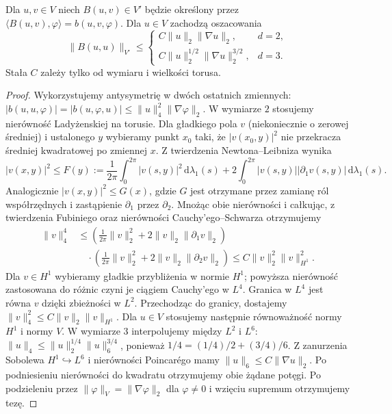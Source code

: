 \begin{lemat}
\label{lem:pde28-B-est}
Dla $u,v\in V$ niech $B(u,v)\in V'$ będzie określony przez
$\langle B(u,v),\varphi\rangle=b(u,v,\varphi)$.
Dla $u\in V$ zachodzą oszacowania
\[
 \|B(u,u)\|_{V'}\le
 \begin{cases}
 C\|u\|_2\|\nabla u\|_2,&d=2,\\
 C\|u\|_2^{1/2}\|\nabla u\|_2^{3/2},&d=3.
 \end{cases}
\]
Stała $C$ zależy tylko od wymiaru i wielkości torusa.
\end{lemat}
\begin{proof}
Wykorzystujemy antysymetrię w dwóch ostatnich zmiennych:
$|b(u,u,\varphi)|=|b(u,\varphi,u)|
\le\|u\|_4^2\|\nabla\varphi\|_2$.
W wymiarze $2$ stosujemy nierówność Ladyżenskiej
na torusie. Dla gładkiego pola $v$ (niekoniecznie
o zerowej średniej) i ustalonego $y$ wybieramy
punkt $x_0$ taki, że $|v(x_0,y)|^2$ nie przekracza
średniej kwadratowej po zmiennej $x$.
Z twierdzenia Newtona--Leibniza wynika
\[
 |v(x,y)|^2\le F(y):=
 \frac1{2\pi}\int_0^{2\pi}|v(s,y)|^2\,\mathrm d\lambda_1(s)
 +2\int_0^{2\pi}|v(s,y)||\partial_1v(s,y)|
 \,\mathrm d\lambda_1(s).
\]
Analogicznie $|v(x,y)|^2\le G(x)$, gdzie $G$
jest otrzymane przez zamianę ról współrzędnych
i zastąpienie $\partial_1$ przez $\partial_2$.
Mnożąc obie nierówności i całkując, z twierdzenia
Fubiniego oraz nierówności Cauchy'ego--Schwarza
otrzymujemy
\[
 \begin{aligned}
 \|v\|_4^4
 &\le \left(\tfrac1{2\pi}\|v\|_2^2
       +2\|v\|_2\|\partial_1v\|_2\right)\\
 &\quad\cdot\left(\tfrac1{2\pi}\|v\|_2^2
       +2\|v\|_2\|\partial_2v\|_2\right)
 \le C\|v\|_2^2\|v\|_{H^1}^2.
 \end{aligned}
\]
Dla $v\in H^1$ wybieramy gładkie przybliżenia
w normie $H^1$; powyższa nierówność zastosowana
do różnic czyni je ciągiem Cauchy'ego w $L^4$.
Granica w $L^4$ jest równa $v$ dzięki zbieżności
w $L^2$. Przechodząc do granicy, dostajemy
$\|v\|_4^2\le C\|v\|_2\|v\|_{H^1}$.
Dla $u\in V$ stosujemy następnie równoważność
normy $H^1$ i normy $V$.
W wymiarze $3$ interpolujemy między $L^2$ i $L^6$:
$\|u\|_4\le\|u\|_2^{1/4}\|u\|_6^{3/4}$, ponieważ
$1/4=(1/4)/2+(3/4)/6$.
Z zanurzenia Sobolewa $H^1\hookrightarrow L^6$
i nierówności Poincarégo mamy
$\|u\|_6\le C\|\nabla u\|_2$.
Po podniesieniu nierówności do kwadratu
otrzymujemy obie żądane potęgi.
Po podzieleniu przez $\|\varphi\|_V=\|\nabla\varphi\|_2$
dla $\varphi\ne0$ i wzięciu supremum otrzymujemy tezę.
\end{proof}

